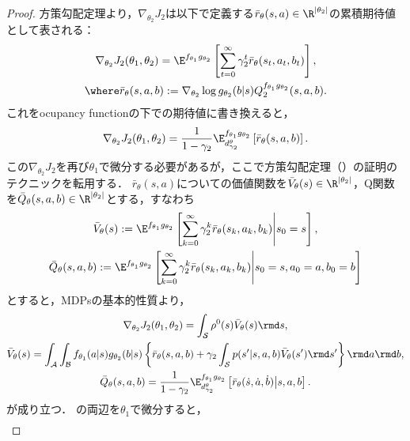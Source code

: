\documentclass[a4paper,10pt,dvipdfmx]{jsarticle}
\begin{document}
\begin{proof}
    方策勾配定理より，$\nabla_{\theta_2}J_2$は以下で定義する$\bar{r}_\theta(s,a)\in\R^{|\theta_2|}$の累積期待値として表される：
    \begin{gather}
        \nabla_{\theta_2}J_2(\theta_1,\theta_2)=\E^{f_{\theta_1}g_{\theta_2}}\left[\sum_{t=0}^\infty\gamma_2^t\bar{r}_\theta(s_t,a_t,b_t)\right],\\
        \where \bar{r}_\theta(s,a,b):=\nabla_{\theta_2}\log g_{\theta_2}(b|s)Q_2^{f_{\theta_1}g_{\theta_2}}(s,a,b).
    \end{gather}
    これをocupancy functionの下での期待値に書き換えると，
    \begin{gather}
        \nabla_{\theta_2}J_2(\theta_1,\theta_2)=\dfrac{1}{1-\gamma_2}\E_{d_{\gamma_2}^{\theta}}^{f_{\theta_1}g_{\theta_2}}\left[\bar{r}_\theta(s,a,b)\right].
    \end{gather}
    この$\nabla_{\theta_2}J_2$を再び$\theta_1$で微分する必要があるが，ここで方策勾配定理（）の証明のテクニックを転用する．
    $\bar{r}_\theta(s,a)$についての価値関数を$\bar{V}_\theta(s)\in\R^{|\theta_2|}$，Q関数を$\bar{Q}_\theta(s,a,b)\in\R^{|\theta_2|}$とする，すなわち
    \begin{gather}
        \bar{V}_\theta(s):=\E^{f_{\theta_1}g_{\theta_2}}\left[\sum_{k=0}^\infty\gamma_2^k\bar{r}_{\theta}(s_k,a_k,b_k)\middle|s_0=s\right],\\
        \bar{Q}_\theta(s,a,b):=\E^{f_{\theta_1}g_{\theta_2}}\left[\sum_{k=0}^\infty\gamma_2^k\bar{r}_{\theta}(s_k,a_k,b_k)\middle|s_0=s,a_0=a,b_0=b\right]
    \end{gather}
    とすると，MDPsの基本的性質より，
    \begin{gather}
        \nabla_{\theta_2}J_2(\theta_1,\theta_2)=\int_{\mathcal{S}}\rho^0(s)\bar{V}_\theta(s)\rmd s,\\
        \bar{V}_\theta(s)
        =\int_{\mathcal{A}}\int_{\mathcal{B}}f_{\theta_1}(a|s)g_{\theta_2}(b|s)\left\{\bar{r}_{\theta}(s,a,b) + \gamma_2\int_{\mathcal{S}}p(s'|s,a,b)\bar{V}_\theta(s')\rmd s'\right\}\rmd a\rmd b,\label{eq:bellman_eq_V_bar}\\
        \bar{Q}_\theta(s,a,b)=\dfrac{1}{1-\gamma_2}\E_{d_{\gamma_2}^{\theta}}^{f_{\theta_1}g_{\theta_2}}\left[\bar{r}_\theta(\dot{s},\dot{a},\dot{b})\middle|s,a,b\right].\label{eq:Q_bar_by_rho}
    \end{gather}
    が成り立つ．
    の両辺を$\theta_1$で微分すると，
    \begin{subequations}
    \begin{align}

\end{align}
\end{subequations}
\end{proof}
\end{document}
